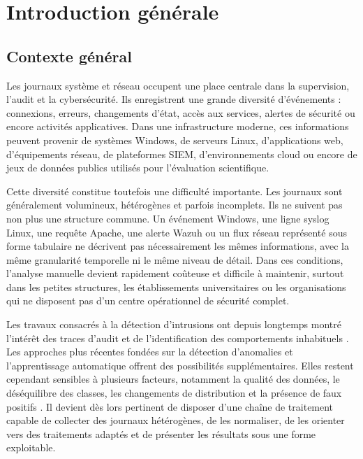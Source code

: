 \chapter{Introduction générale}

\section{Contexte général}

Les journaux système et réseau occupent une place centrale dans la supervision, l'audit et la cybersécurité. Ils enregistrent une grande diversité d'événements : connexions, erreurs, changements d'état, accès aux services, alertes de sécurité ou encore activités applicatives. Dans une infrastructure moderne, ces informations peuvent provenir de systèmes Windows, de serveurs Linux, d'applications web, d'équipements réseau, de plateformes SIEM, d'environnements cloud ou encore de jeux de données publics utilisés pour l'évaluation scientifique.

Cette diversité constitue toutefois une difficulté importante. Les journaux sont généralement volumineux, hétérogènes et parfois incomplets. Ils ne suivent pas non plus une structure commune. Un événement Windows, une ligne syslog Linux, une requête Apache, une alerte Wazuh ou un flux réseau représenté sous forme tabulaire ne décrivent pas nécessairement les mêmes informations, avec la même granularité temporelle ni le même niveau de détail. Dans ces conditions, l'analyse manuelle devient rapidement coûteuse et difficile à maintenir, surtout dans les petites structures, les établissements universitaires ou les organisations qui ne disposent pas d'un centre opérationnel de sécurité complet.

Les travaux consacrés à la détection d'intrusions ont depuis longtemps montré l'intérêt des traces d'audit et de l'identification des comportements inhabituels \cite{denning1987intrusion,axelsson2000intrusion}. Les approches plus récentes fondées sur la détection d'anomalies et l'apprentissage automatique offrent des possibilités supplémentaires. Elles restent cependant sensibles à plusieurs facteurs, notamment la qualité des données, le déséquilibre des classes, les changements de distribution et la présence de faux positifs \cite{chandola2009anomaly,buczak2016survey,khraisat2019survey}. Il devient dès lors pertinent de disposer d'une chaîne de traitement capable de collecter des journaux hétérogènes, de les normaliser, de les orienter vers des traitements adaptés et de présenter les résultats sous une forme exploitable.

